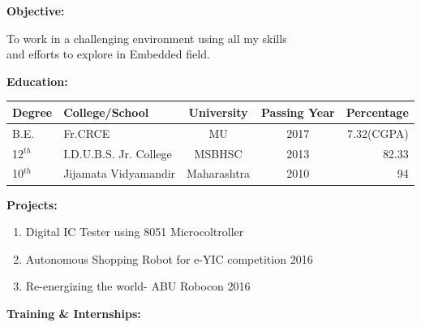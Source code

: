 \documentclass[a4paper]{article}
\begin{document}
	\begin{flushleft}
		 	\begin{Large}\textbf{Objective:}\end{Large}  To work in a challenging environment using all my skills\\\hspace{1in} and efforts to explore in Embedded field.\\
 	
		 	\begin{Large}\vspace{0.3in}\textbf{Education:}\end{Large}
			 	\vspace{-3mm}
			 	\begin{center}
				 	\begin{tabular}{|l|l|c|c|r|}
					 	\hline
					 	Degree & College/School & University & Passing Year & Percentage\\ \hline
 
						B.E. & Fr.CRCE & MU & 2017 & 7.32(CGPA)\\ \hline
 
					 	12$^{th}$ & I.D.U.B.S. Jr. College & MSBHSC & 2013 & 82.33\\ \hline
 
						10$^{th}$ & Jijamata Vidyamandir & Maharashtra & 2010 & 94\\ \hline

				 	\end{tabular}
			    \end{center}
    
    
  	\begin{Large}\vspace{0.1in}\textbf{Projects:}\end{Large}
  	\begin{enumerate}
  		\item Digital IC Tester using 8051 Microcoltroller
  		\item Autonomous Shopping Robot for e-YIC competition 2016
  		\item Re-energizing the world- ABU Robocon 2016
  	\end{enumerate}
  	
  	
  	
  
	  	\begin{Large}\vspace{0.1in}\textbf{Training \& Internships:}\end{Large}\\
	  	\begin{itemize}
	  		

\end{itemize}
\end{flushleft}
\end{document}
